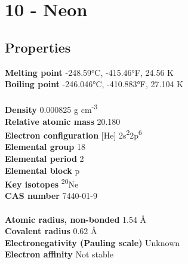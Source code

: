 \section{10 - Neon}
\label{sec:elem-neon}
\subsection{Properties}
\textbf{Melting point} -248.59°C, -415.46°F, 24.56 K\\
\textbf{Boiling point} -246.046°C, -410.883°F, 27.104 K\\
\\
\textbf{Density} 0.000825 g cm\textsuperscript{-3}\\
\textbf{Relative atomic mass} 20.180\\
\textbf{Electron configuration} [He] 2s\textsuperscript{2}2p\textsuperscript{6}\\
\textbf{Elemental group} 18\\
\textbf{Elemental period} 2\\
\textbf{Elemental block} p\\
\textbf{Key isotopes} \textsuperscript{20}Ne\\
\textbf{CAS number} 7440-01-9\\
\\
\textbf{Atomic radius, non-bonded} 1.54 Å\\
\textbf{Covalent radius} 0.62 Å\\
\textbf{Electronegativity (Pauling scale)} Unknown\\
\textbf{Electron affinity} Not stable\\